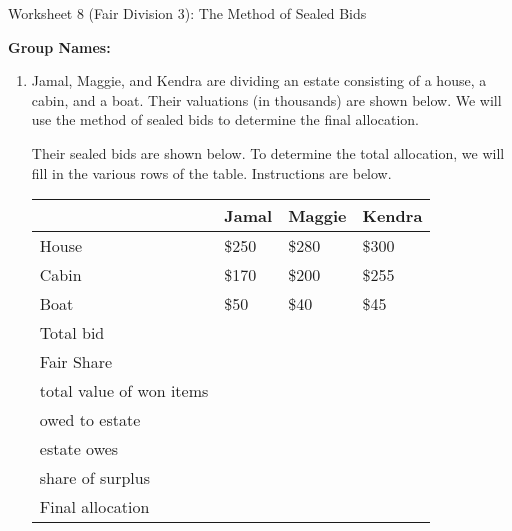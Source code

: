 \documentclass[12pt]{article}
\begin{document}
\begin{center}
{\Large  Worksheet 8 (Fair Division 3): The Method of Sealed Bids}
\end{center}



\noindent \textbf{Group Names:} \hrulefill \\
\begin{enumerate}
\item Jamal, Maggie, and Kendra are dividing an estate consisting of a house, a cabin, and
a boat.  Their valuations (in thousands) are shown below. We will use the method of sealed bids to determine the final allocation.

Their sealed bids are shown below. To determine the total allocation, we will fill in the various rows of the table. Instructions are below.


\begin{tabularx}{\linewidth}{| p{1.5in} | X | X | X|}
\hline
& {\bf Jamal} & {\bf Maggie} & {\bf Kendra } \\ \hline \hline
House &\$250 & \$280 & \$300\\ \hline
Cabin & \$170 &\$200  & \$255 \\ \hline
Boat & \$50& \$40& \$45 \\ \hline
Total bid & & & \\[10pt] \hline
Fair Share & & & \\[10pt] \hline
 total value of won items  & & & \\[10pt] \hline
 owed to estate  & & & \\[10pt] \hline
 estate owes  & & & \\[10pt] \hline
 share of surplus  & & & \\[10pt] \hline
 Final allocation & & & \\[20pt]
\hline
\end{tabularx}


\end{enumerate}
\end{document}
